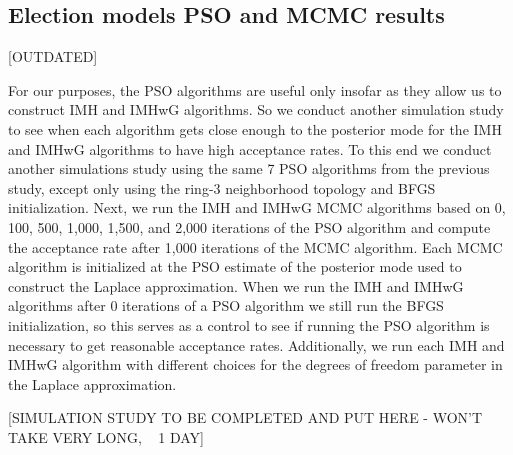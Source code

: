 \documentclass[12pt]{article}
\begin{document}
\subsection{Election models PSO and MCMC results}

[OUTDATED]

For our purposes, the PSO algorithms are useful only insofar as they allow us to construct IMH and IMHwG algorithms. So we conduct another simulation study to see when each algorithm gets close enough to the posterior mode for the IMH and IMHwG algorithms to have high acceptance rates. To this end we conduct another simulations study using the same 7 PSO algorithms from the previous study, except only using the ring-3 neighborhood topology and BFGS initialization. Next, we run the IMH and IMHwG MCMC algorithms based on 0, 100, 500, 1,000, 1,500, and 2,000 iterations of the PSO algorithm and compute the acceptance rate after 1,000 iterations of the MCMC algorithm. Each MCMC algorithm is initialized at the PSO estimate of the posterior mode used to construct the Laplace approximation. When we run the IMH and IMHwG algorithms after 0 iterations of a PSO algorithm we still run the BFGS initialization, so this serves as a control to see if running the PSO algorithm is necessary to get reasonable acceptance rates. Additionally, we run each IMH and IMHwG algorithm with different choices for the degrees of freedom parameter in the Laplace approximation.

[SIMULATION STUDY TO BE COMPLETED AND PUT HERE - WON'T TAKE VERY LONG, ~ 1 DAY]

\end{document}
